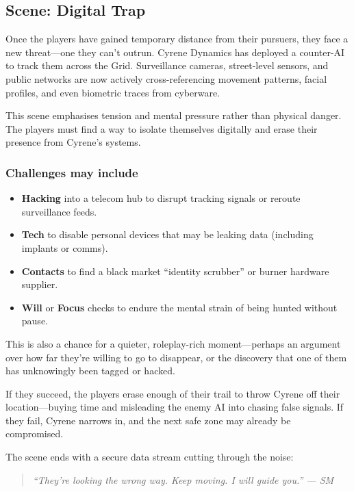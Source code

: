 \documentclass[nodeprecatedcode,bg=print]{dndbook}
\begin{document}
\begin{multicols}{2}
\subsection*{Scene: Digital Trap}

Once the players have gained temporary distance from their pursuers, they face a new threat—one they can’t outrun. Cyrene Dynamics has deployed a counter-AI to track them across the Grid. Surveillance cameras, street-level sensors, and public networks are now actively cross-referencing movement patterns, facial profiles, and even biometric traces from cyberware.

This scene emphasises tension and mental pressure rather than physical danger. The players must find a way to isolate themselves digitally and erase their presence from Cyrene’s systems.

\subsubsection{Challenges may include}
\begin{itemize}
    \item \textbf{Hacking} into a telecom hub to disrupt tracking signals or reroute surveillance feeds.
    \item \textbf{Tech} to disable personal devices that may be leaking data (including implants or comms).
    \item \textbf{Contacts} to find a black market “identity scrubber” or burner hardware supplier.
    \item \textbf{Will} or \textbf{Focus} checks to endure the mental strain of being hunted without pause.
\end{itemize}

This is also a chance for a quieter, roleplay-rich moment—perhaps an argument over how far they’re willing to go to disappear, or the discovery that one of them has unknowingly been tagged or hacked.

If they succeed, the players erase enough of their trail to throw Cyrene off their location—buying time and misleading the enemy AI into chasing false signals. If they fail, Cyrene narrows in, and the next safe zone may already be compromised.

The scene ends with a secure data stream cutting through the noise:

\vspace{0.5\baselineskip}
\begin{quote}
\textit{“They’re looking the wrong way. Keep moving. I will guide you.” — SM}
\end{quote}
\vspace{0.5\baselineskip}


\end{multicols}
\end{document}
